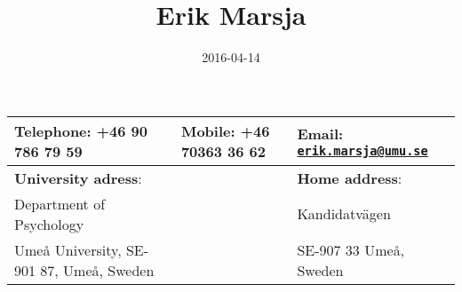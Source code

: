 \documentclass[]{article}
\title{Erik Marsja}
\author{}
\date{2016-04-14}
\begin{document}
\maketitle

\begin{longtable}[c]{@{}lll@{}}
\toprule
\begin{minipage}[b]{0.41\columnwidth}\raggedright\strut
\textbf{Telephone}: +46 90 786 79 59
\strut\end{minipage} &
\begin{minipage}[b]{0.27\columnwidth}\raggedright\strut
\textbf{Mobile}: +46 70363 36 62
\strut\end{minipage} &
\begin{minipage}[b]{0.27\columnwidth}\raggedright\strut
\textbf{Email}:
\href{mailto:erik.marsja@umu.se}{\nolinkurl{erik.marsja@umu.se}}
\strut\end{minipage}\tabularnewline
\midrule
\endhead
\begin{minipage}[t]{0.41\columnwidth}\raggedright\strut
\textbf{University adress}:
\strut\end{minipage} &
\begin{minipage}[t]{0.27\columnwidth}\raggedright\strut
\strut\end{minipage} &
\begin{minipage}[t]{0.27\columnwidth}\raggedright\strut
\textbf{Home address}:
\strut\end{minipage}\tabularnewline
\begin{minipage}[t]{0.41\columnwidth}\raggedright\strut
Department of Psychology
\strut\end{minipage} &
\begin{minipage}[t]{0.27\columnwidth}\raggedright\strut
\strut\end{minipage} &
\begin{minipage}[t]{0.27\columnwidth}\raggedright\strut
Kandidatvägen
\strut\end{minipage}\tabularnewline
\begin{minipage}[t]{0.41\columnwidth}\raggedright\strut
Umeå University, SE-901 87, Umeå, Sweden
\strut\end{minipage} &
\begin{minipage}[t]{0.27\columnwidth}\raggedright\strut
\strut\end{minipage} &
\begin{minipage}[t]{0.27\columnwidth}\raggedright\strut
SE-907 33 Umeå, Sweden
\strut\end{minipage}\tabularnewline
\bottomrule
\end{longtable}
\end{document}

